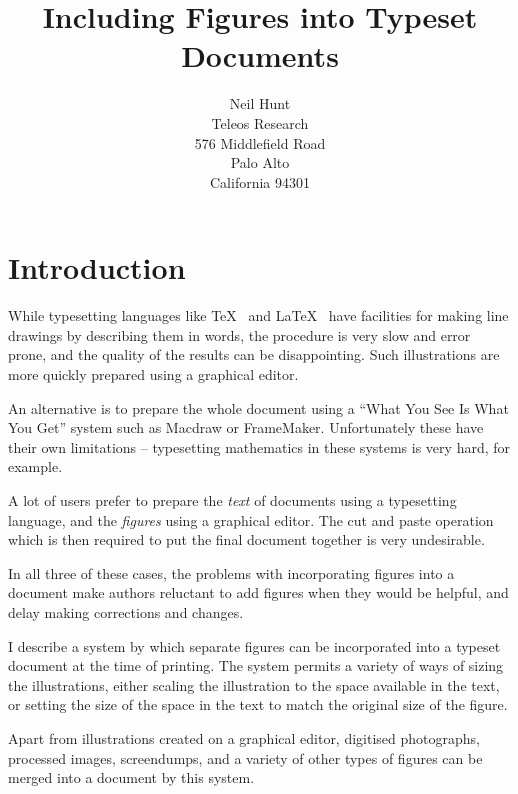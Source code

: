 \sloppy



\title{Including Figures into Typeset Documents}

\author{Neil Hunt \\
	Teleos Research \\
	576 Middlefield Road \\
	Palo Alto \\
	California 94301}
\maketitle

\section{Introduction}

While typesetting languages like \TeX\ \cite{Knuth:texbook}
and \LaTeX\ \cite{Lamport:latex} have
facilities for making line drawings by describing them in
words,
the procedure is very slow and error prone,
and the quality of the results can be disappointing.
Such illustrations are more quickly prepared using
a graphical editor.

An alternative is to prepare the whole document
using a
``What You See Is What You Get''
system such as Macdraw or FrameMaker.
Unfortunately these have their own limitations --
typesetting mathematics in these systems is very hard,
for example.

A lot of users prefer to prepare the {\em text} of documents
using a typesetting language,
and the {\em figures} using a graphical editor.
The cut and paste operation which is then required to put the
final document together is very undesirable.

In all three of these cases, the problems with incorporating
figures into a document make authors
reluctant to add figures when they would be helpful,
and delay making corrections and changes.

I describe a system
by which separate figures
can be incorporated into a typeset document
at the time of printing.
The system permits a variety of ways of sizing the illustrations,
either scaling the illustration to the
space available in the text,
or setting the size of the space in the text
to match the original size of the figure.

Apart from illustrations created on a graphical editor,
digitised photographs, processed images, screendumps, and a variety
of other types of figures can be merged into
a document by this system.

